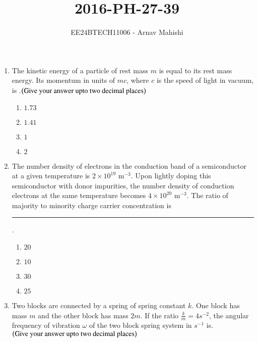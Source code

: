 \documentclass[journal]{IEEEtran}
\begin{document}

\vspace{3cm}

\title{2016-PH-27-39}
\author{EE24BTECH11006 - Arnav Mahishi}
{\let\newpage\relax\maketitle}
\begin{enumerate}
\item{
The kinetic energy of a particle of rest mass $m$ is equal to its rest mass energy. Its momentum in units of $mc$, where $c$ is the speed of light in vacuum, is .$\left(\text{Give your answer upto two decimal places}\right)$
\begin{multicols}{4}
\begin{enumerate}
\item $1.73$
\item $1.41$
\item $1$
\item $2$
\end{enumerate}
\end{multicols}
}
\item{
The number density of electrons in the conduction band of a semiconductor at a given temperature is $2 \times 10^{19} \text{ m}^{-3}$. Upon lightly doping this semiconductor with donor impurities, the number density of conduction electrons at the same temperature becomes $4 \times 10^{20} \text{ m}^{-3}$. The ratio of majority to minority charge carrier concentration is \rule{3cm}{0.15mm}.
\begin{multicols}{2}
\begin{enumerate}
\item $20$ 
\item $10$
\item $30$
\item $25$
\end{enumerate}
\end{multicols}}
\item{
Two blocks are connected by a spring of spring constant $k$. One block has mass $m$ and the other block has mass $2m$. If the ratio $\frac{k}{m}=4s^{-2}$, the angular frequency of vibration $\omega$ of the two block spring system in $s^{-1}$
is. $\left(\text{Give your answer upto two decimal places}\right)$
\begin{multicols}{4}

\end{multicols}}
\end{enumerate}
\end{document}

